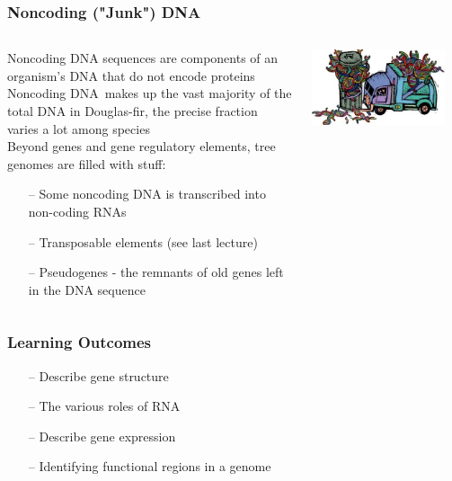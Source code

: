 \documentclass{beamer}
\begin{document}
\begin{frame}
	\frametitle{Noncoding ("Junk") DNA}

\begin{columns}
	\begin{column}{0.5\textwidth}
\scriptsize
Noncoding DNA sequences are components of an organism's DNA that do not encode proteins\\
\vspace{10pt}
Noncoding DNA makes up the vast majority of the total DNA in Douglas-fir, the precise fraction varies a lot among species \\
\vspace{10pt}
Beyond genes and gene regulatory elements, tree genomes are filled with stuff:\\
\vspace{10pt}

	\begin{itemize}
		
\item[--]	Some noncoding DNA is transcribed into non-coding RNAs
\item[--] Transposable elements (see last lecture)
\item[--] 	Pseudogenes - the remnants of old genes left in the DNA sequence
\end{itemize}
\end{column}
\begin{column}{0.5\textwidth}
				\includegraphics[keepaspectratio, width  = 0.9\textwidth]{img/junk}
\end{column}
\end{columns}
\end{frame}


\begin{frame}
	\frametitle{Learning Outcomes}
	\begin{itemize}
		\item[--] Describe gene structure
		\item[--] The various roles of RNA
		\item[--] Describe gene expression
		\item[--] Identifying functional regions in a genome
		 
	\end{itemize}
\end{frame}
\end{document}
